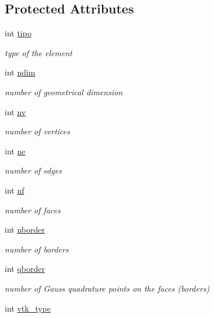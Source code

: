 \subsection*{Protected Attributes}
\begin{DoxyCompactItemize}
\item 
int \hyperlink{classStdel_a68f8781a42728758ccde39e15cd319ed}{tipo}
\begin{DoxyCompactList}\small\item\em type of the element \end{DoxyCompactList}\item 
int \hyperlink{classStdel_a912f36b591d847eed2531a3b3a51a520}{ndim}
\begin{DoxyCompactList}\small\item\em number of geometrical dimension \end{DoxyCompactList}\item 
int \hyperlink{classStdel_a20c0e35541cab4a1f07974659ae7a9ad}{nv}
\begin{DoxyCompactList}\small\item\em number of vertices \end{DoxyCompactList}\item 
int \hyperlink{classStdel_aef3d1b34184b9fd03c0b655640c243b6}{ne}
\begin{DoxyCompactList}\small\item\em number of edges \end{DoxyCompactList}\item 
int \hyperlink{classStdel_a61987080026986a40412a8937aad4b24}{nf}
\begin{DoxyCompactList}\small\item\em number of faces \end{DoxyCompactList}\item 
int \hyperlink{classStdel_ad0f111a2ba3d9415618c8408da3fc100}{nborder}
\begin{DoxyCompactList}\small\item\em number of borders \end{DoxyCompactList}\item 
int \hyperlink{classStdel_a63a106b928d211c71d5fec6449ef4d51}{qborder}
\begin{DoxyCompactList}\small\item\em number of Gauss quadrature points on the faces (borders) \end{DoxyCompactList}\item 
int \hyperlink{classStdel_a55624584790a08437c03540489d04898}{vtk\+\_\+type}

\end{DoxyCompactItemize}
